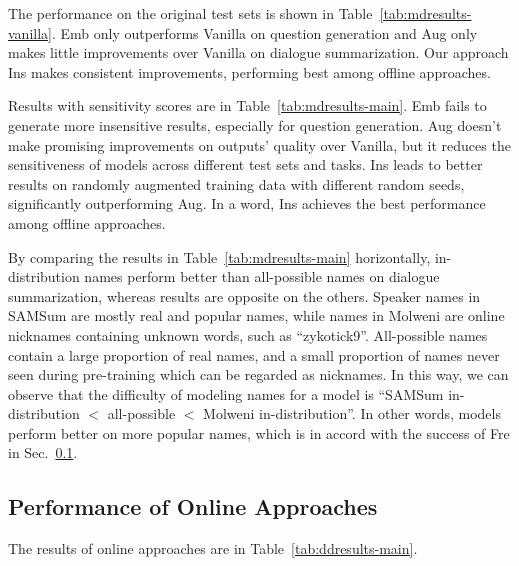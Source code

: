 The performance on the original test sets is shown in Table~\ref{tab:mdresults-vanilla}. Emb only outperforms Vanilla on question generation and Aug only makes little improvements over Vanilla on dialogue summarization. %
Our approach {Ins} makes consistent improvements, {performing best among offline approaches}.

Results with sensitivity scores are in Table~\ref{tab:mdresults-main}. 
Emb fails to generate more insensitive results, especially for question generation.
{Aug} doesn't make promising improvements on outputs' quality over Vanilla, but it {reduces the sensitiveness of models} across different test sets and tasks.
Ins leads to better results on randomly augmented training data with different random seeds, significantly outperforming Aug. %
In a word, Ins achieves the best performance among offline approaches. %

By comparing the results in Table~\ref{tab:mdresults-main} horizontally, in-distribution names perform better than all-possible names on dialogue summarization, whereas results are opposite on the others. Speaker names in SAMSum are mostly real and popular names, while names in Molweni are online nicknames containing unknown words, such as ``zykotick9''. All-possible names contain a large proportion of real names, and a small proportion of names never seen during pre-training which can be regarded as nicknames. In this way, we can observe that the difficulty of modeling names for a model is ``SAMSum in-distribution  $<$ all-possible $<$ Molweni in-distribution''. In other words, models perform better on more popular names, which is in accord with the success of Fre in Sec.~\ref{sec:onlineapproach}.









\subsection{Performance of Online Approaches}
\label{sec:onlineapproach}

The results of online approaches are in Table~\ref{tab:ddresults-main}.



